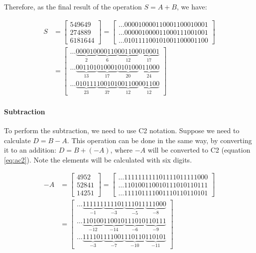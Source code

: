 \documentclass[10pt]{article}
\begin{document}
Therefore, as the final result of the operation $S= A + B$, we have:

\begin{align}
	S &=\begin{bmatrix}
	      549649\\ 
	      274889\\ 
	      6181644
	    \end{bmatrix}
        =
        \begin{bmatrix}
	    \ldots000010000110001100010001\\
	    \ldots000001000011000111001001\\
	    \ldots010111100101001100001100
	\end{bmatrix}
      \\ \nonumber      
      &=\begin{bmatrix}
  \ldots\underbrace{000010}_{2}\underbrace{000110}_{6}\underbrace{001100}_{12}
  \underbrace{010001}_{17}\\	
  \ldots\underbrace{001101}_{13}\underbrace{010001}_{17}\underbrace{010100}_{20}
  \underbrace{011000}_{24}\\
  \ldots\underbrace{010111}_{23}\underbrace{100101}_{37}\underbrace{001100}_{12}
  \underbrace{001100}_{12}
	\end{bmatrix}
\end{align}

\paragraph{Subtraction}
To perform the subtraction, we need to use C2 notation. Suppose  we need to
calculate $D = B - A$. This operation can be done in the same way, by
converting it to an addition: $D = B + (-A)$, where $-A$ will be converted to
C2 (equation \ref{eq:ac2}). Note the elements will be calculated with six
digits.

\begin{align}\label{eq:ac2}
	-A &= \begin{bmatrix}
		4952\\ 
		52841\\ 
		14251
	      \end{bmatrix} 
        =
        \begin{bmatrix}
	  \ldots111111111101111011111000\\ 
	  \ldots110100110010111010110111\\ 
	  \ldots111101111001110110110101
	\end{bmatrix}
        \\\nonumber
        &=\begin{bmatrix}
\ldots\underbrace{111111}_{-1}\underbrace{111101}_{-3}\underbrace{111011}_{-5}
\underbrace{111000}_{-8}\\
\ldots\underbrace{110100}_{-12}\underbrace{110010}_{-14}\underbrace{111010}_{-6}
\underbrace{110111}_{-9}\\
\ldots\underbrace{111101}_{-3}\underbrace{111001}_{-7}\underbrace{110110}_{-10}
\underbrace{110101}_{-11}
	  \end{bmatrix}
\end{align}
\end{document}
